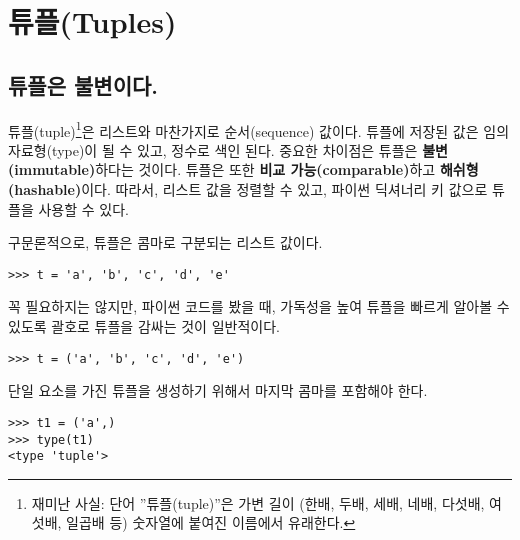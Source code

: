 
\chapter{튜플(Tuples)}
\label{tuplechap}

\section{튜플은 불변이다.}


튜플(tuple)\footnote{재미난 사실: 단어 ''튜플(tuple)''은 가변 길이 (한배, 두배, 세배, 네배, 다섯배, 여섯배, 일곱배 등) 숫자열에 
붙여진 이름에서 유래한다.}은 리스트와 마찬가지로 순서(sequence) 값이다. 
튜플에 저장된 값은 임의 자료형(type)이 될 수 있고, 정수로 색인 된다.
중요한 차이점은 튜플은 {\bf 불변(immutable)}하다는 것이다.
튜플은 또한 {\bf 비교 가능(comparable)}하고 {\bf 해쉬형(hashable)}이다.
따라서, 리스트 값을 정렬할 수 있고, 파이썬 딕셔너리 키 값으로 튜플을 사용할 수 있다.


구문론적으로, 튜플은 콤마로 구분되는 리스트 값이다.

\beforeverb
\begin{verbatim}
>>> t = 'a', 'b', 'c', 'd', 'e'
\end{verbatim}
\afterverb
%

꼭 필요하지는 않지만, 파이썬 코드를 봤을 때, 가독성을 높여 튜플을 빠르게 알아볼 수 있도록 괄호로 튜플을 감싸는 것이 일반적이다.


\beforeverb
\begin{verbatim}
>>> t = ('a', 'b', 'c', 'd', 'e')
\end{verbatim}
\afterverb
%

단일 요소를 가진 튜플을 생성하기 위해서 마지막 콤마를 포함해야 한다.


\beforeverb
\begin{verbatim}
>>> t1 = ('a',)
>>> type(t1)
<type 'tuple'>
\end{verbatim}
\afterverb
%

